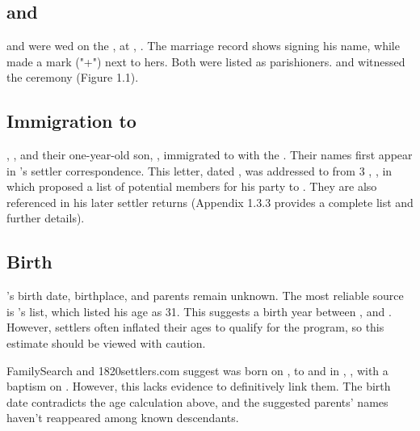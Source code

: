 \chapter[James McDonald]{\mcdonaldJName{}}
\label{ch1: James McDonald}

\section[James McDonald and Mary Welch]{\mcdonaldJName{} and \welchMName{}}
\label{sec: James McDonald and Mary Welch}

\mcdonaldJName{} and \welchMName{} were wed on the , at \stBotolphWithoutBishopsgate{}, \bishopsgateFull{}. The marriage record shows \mcdonaldJNameOnly{} signing his name, while \welchMNameOnly{} made a mark ("+") next to hers. Both were listed as parishioners. \nettoIName{} and \nettoCNameNee{} witnessed the ceremony (Figure 1.1).

\section[Immigration to South Africa]{{Immigration to \southAfrica{}}}
\label{sec: Immigration to South Africa}

\mcdonaldJNameOnly{}, \welchMNameOnly{}, and their one-year-old son, \mcdonaldANameOnly{}, immigrated to \southAfrica{} with the \settlersBritish{}. Their names first appear in \biggarAName{}'s settler correspondence. This letter, dated , was addressed to \bathhurstHName{} from 3 \northumberlandCourtFull{}, \london{}, in which \biggarASurname{} proposed a list of potential members for his party to \southAfrica. They are also referenced in his later settler returns (Appendix 1.3.3 provides a complete list and further details).

\section[Birth]{Birth}
\label{sec: Birth}

\mcdonaldJNameOnly{}'s birth date, birthplace, and parents remain unknown. The most reliable source is \biggarASurname{}'s \settler{} list, which listed his age as 31. This suggests a birth year between , and . However, settlers often inflated their ages to qualify for the program, so this estimate should be viewed with caution.

FamilySearch and 1820settlers.com suggest \mcdonaldJName{} was born on , to \mcdonaldWWFullNames{} and \aitchisonJFullNames{} in \crawfordFull{}, \scotland{}, with a baptism on . However, this lacks evidence to definitively link them. The birth date contradicts the age calculation above, and the suggested parents' names haven't reappeared among known descendants.

